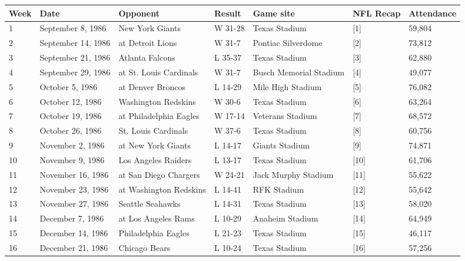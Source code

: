 \documentclass{article}
\begin{document}
\begin{tabular}{lllllll}
\toprule
Week & Date & Opponent & Result & Game site & NFL Recap & Attendance \\
\midrule
1 & September 8, 1986 & New York Giants & W 31-28 & Texas Stadium & [1] & 59,804 \\
2 & September 14, 1986 & at Detroit Lions & W 31-7 & Pontiac Silverdome & [2] & 73,812 \\
3 & September 21, 1986 & Atlanta Falcons & L 35-37 & Texas Stadium & [3] & 62,880 \\
4 & September 29, 1986 & at St. Louis Cardinals & W 31-7 & Busch Memorial Stadium & [4] & 49,077 \\
5 & October 5, 1986 & at Denver Broncos & L 14-29 & Mile High Stadium & [5] & 76,082 \\
6 & October 12, 1986 & Washington Redskins & W 30-6 & Texas Stadium & [6] & 63,264 \\
7 & October 19, 1986 & at Philadelphia Eagles & W 17-14 & Veterans Stadium & [7] & 68,572 \\
8 & October 26, 1986 & St. Louis Cardinals & W 37-6 & Texas Stadium & [8] & 60,756 \\
9 & November 2, 1986 & at New York Giants & L 14-17 & Giants Stadium & [9] & 74,871 \\
10 & November 9, 1986 & Los Angeles Raiders & L 13-17 & Texas Stadium & [10] & 61,706 \\
11 & November 16, 1986 & at San Diego Chargers & W 24-21 & Jack Murphy Stadium & [11] & 55,622 \\
12 & November 23, 1986 & at Washington Redskins & L 14-41 & RFK Stadium & [12] & 55,642 \\
13 & November 27, 1986 & Seattle Seahawks & L 14-31 & Texas Stadium & [13] & 58,020 \\
14 & December 7, 1986 & at Los Angeles Rams & L 10-29 & Anaheim Stadium & [14] & 64,949 \\
15 & December 14, 1986 & Philadelphia Eagles & L 21-23 & Texas Stadium & [15] & 46,117 \\
16 & December 21, 1986 & Chicago Bears & L 10-24 & Texas Stadium & [16] & 57,256 \\
\bottomrule
\end{tabular}
\end{document}
